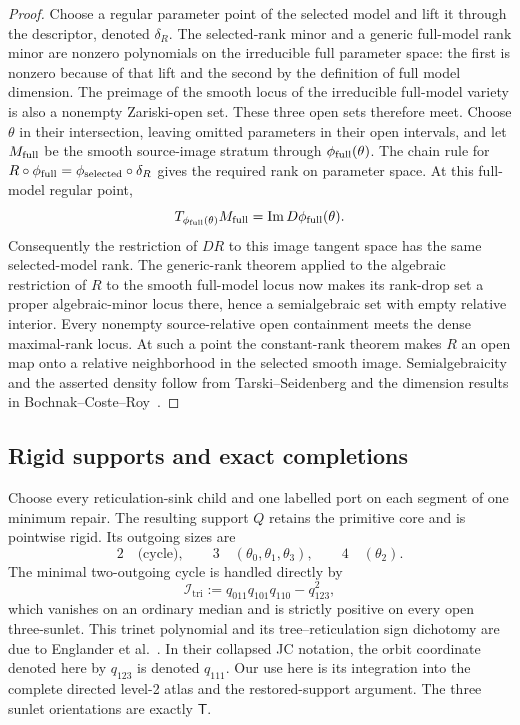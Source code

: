 \documentclass[11pt]{article}
\theoremstyle{remark}
\newcommand{\Tmove}{\mathsf T}
\begin{document}
\begin{proof}
Choose a regular parameter point of the selected model and lift it through
the descriptor, denoted $\delta_R$.  The selected-rank minor and a generic
full-model rank minor
are nonzero polynomials on the irreducible full parameter space: the first is
nonzero because of that lift and the second by the definition of full model
dimension.  The preimage of the smooth locus of the irreducible full-model
variety is also a nonempty Zariski-open set.  These three open sets therefore
meet.  Choose $\theta$ in their intersection, leaving omitted parameters in
their open intervals, and let $M_{\rm full}$ be the smooth source-image
stratum through $\phi_{\rm full}(\theta)$.  The chain rule for
$R\circ\phi_{\rm full}=\phi_{\rm selected}\circ\delta_R$ gives the required
rank on parameter space.  At this full-model regular point,
\[
T_{\phi_{\rm full}(\theta)}M_{\rm full}
=\operatorname{Im}D\phi_{\rm full}(\theta).
\]
Consequently the restriction of $DR$ to this image tangent space has the
same selected-model rank.  The generic-rank theorem applied to the algebraic
restriction of $R$ to the smooth full-model locus now makes its rank-drop set
a proper algebraic-minor locus there, hence a semialgebraic set with empty
relative interior.  Every
nonempty source-relative open containment meets the dense maximal-rank locus.
At such a point the constant-rank theorem makes $R$ an open map onto a
relative neighborhood in the selected smooth image.  Semialgebraicity and
the asserted density follow from Tarski--Seidenberg and the dimension results
in Bochnak--Coste--Roy~\cite[Theorem~2.2.1, applied iteratively, and
Propositions~2.8.2, 2.8.4, and 2.8.13]{BochnakCosteRoy1998}.
\end{proof}

\subsection{Rigid supports and exact completions}

Choose every reticulation-sink child and one labelled port on each segment of
one minimum repair.  The resulting support $Q$ retains the primitive core and
is pointwise rigid.  Its outgoing sizes are
\[
2\quad\text{(cycle)},\qquad
3\quad(\theta_0,\theta_1,\theta_3),\qquad
4\quad(\theta_2).
\]
The minimal two-outgoing cycle is handled directly by
\begin{equation}\label{eq:trinet-invariant}
\mathcal I_{\mathrm{tri}}
:=q_{011}q_{101}q_{110}-q_{123}^2,
\end{equation}
which vanishes on an ordinary median and is strictly positive on every open
three-sunlet.  This trinet polynomial and its tree--reticulation sign
dichotomy are due to Englander et al.~\cite[Proposition~2.15]{EnglanderEtAl2026}.
In their collapsed JC notation, the orbit coordinate denoted here by
$q_{123}$ is denoted $q_{111}$.
Our use here is its integration into the complete directed level-2 atlas and
the restored-support argument.  The three sunlet orientations are exactly
$\Tmove$.
\end{document}
